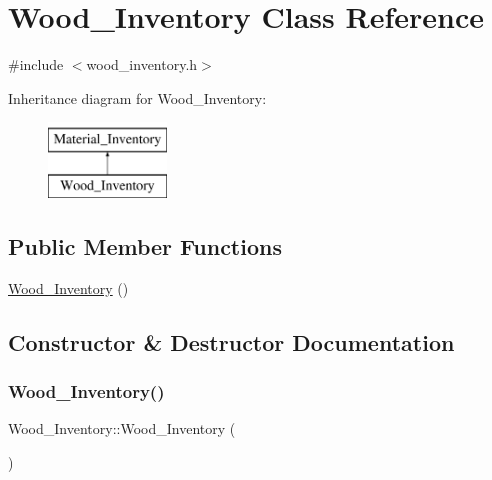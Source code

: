 \hypertarget{classWood__Inventory}{}\section{Wood\+\_\+\+Inventory Class Reference}
\label{classWood__Inventory}


{\ttfamily \#include $<$wood\+\_\+inventory.\+h$>$}

Inheritance diagram for Wood\+\_\+\+Inventory\+:\begin{figure}[H]
\begin{center}
\leavevmode
\includegraphics[height=2.000000cm]{classWood__Inventory}
\end{center}
\end{figure}
\subsection*{Public Member Functions}
\begin{DoxyCompactItemize}
\item 
\hyperlink{classWood__Inventory_afcf1c5469106083ce0ab7a7ee5e15523}{Wood\+\_\+\+Inventory} ()
\end{DoxyCompactItemize}


\subsection{Constructor \& Destructor Documentation}
\mbox{\label{classWood__Inventory_afcf1c5469106083ce0ab7a7ee5e15523}} 
\subsubsection{\texorpdfstring{Wood\+\_\+\+Inventory()}{Wood\_Inventory()}}
{\footnotesize\ttfamily Wood\+\_\+\+Inventory\+::\+Wood\+\_\+\+Inventory (\begin{DoxyParamCaption}{ }\end{DoxyParamCaption})}



